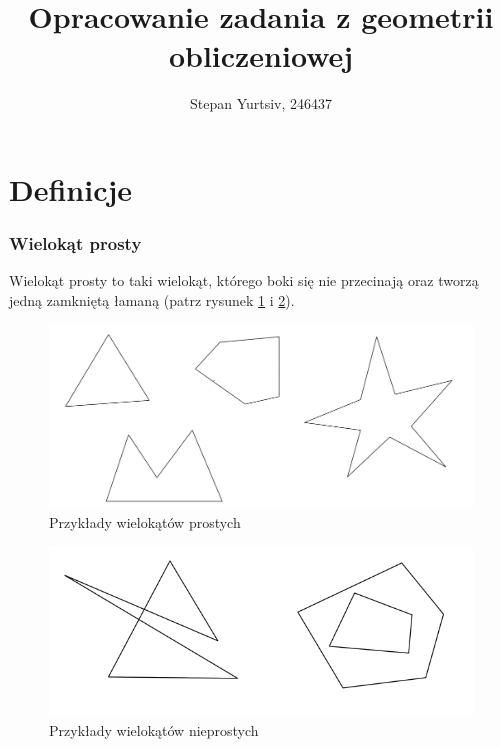 \documentclass[12pt, a4paper]{article}
\title{Opracowanie zadania z geometrii obliczeniowej}
\author{Stepan Yurtsiv, 246437}
\begin{document}
\maketitle

\section*{Definicje}

\subsubsection*{Wielokąt prosty}

Wielokąt prosty to taki wielokąt, którego boki się nie przecinają oraz tworzą jedną zamkniętą łamaną (patrz rysunek \ref{fig:wielokat_prosty} i \ref{fig:wielokat_nieprosty}).

\begin{figure}[H]
  \begin{center}
  \includegraphics[scale=0.4]{Prosty}
  \caption{Przykłady wielokątów prostych}
  \label{fig:wielokat_prosty}
  \end{center}
\end{figure}

\begin{figure}[H]
  \begin{center}
  \includegraphics[scale=0.5]{Nieprosty}
  \caption{Przykłady wielokątów nieprostych}
  \label{fig:wielokat_nieprosty}
  \end{center}
\end{figure}
\end{document}
